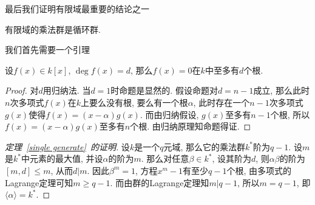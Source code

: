 最后我们证明有限域最重要的结论之一
\begin{thm}\label{single generate}
    有限域的乘法群是循环群.
\end{thm}

我们首先需要一个引理
\begin{lem}[多项式的Lagrange定理]
    设$f(x)\in k[x]$, $\deg f(x)=d$, 那么$f(x)=0$在$k$中至多有$d$个根.
\end{lem}
\begin{proof}
    对$d$用归纳法.
    当$d=1$时命题是显然的.
    假设命题对$d=n-1$成立, 那么此时$n$次多项式$f(x)$在$k$上要么没有根, 要么有一个根$\alpha$, 此时存在一个$n-1$次多项式$g(x)$使得$f(x)=(x-\alpha)g(x)$.
    而由归纳假设, $g(x)$至多有$n-1$个根, 所以$f(x)=(x-\alpha)g(x)$至多有$n$个根.
    由归纳原理知命题得证.
\end{proof}

\begin{proof}[定理~\ref{single generate}~的证明]
    设$k$是一个$q$元域, 那么它的乘法群$k^*$阶为$q-1$.
    设$m$是$k^*$中元素的最大值, 并设$\alpha$的阶为$m$.
    那么对任意$\beta\in k^*$, 设其阶为$d$, 则$\alpha\beta$的阶为$[m,d]\leq m$, 从而$d|m$.
    因此$\beta^m=1$, 方程$x^m-1$有至少$q-1$个根, 由多项式的Lagrange定理可知$m\geq q-1$.
    而由群的Lagrange定理知$m|q-1$, 所以$m=q-1$, 即$\langle\alpha\rangle=k^*$.
\end{proof}